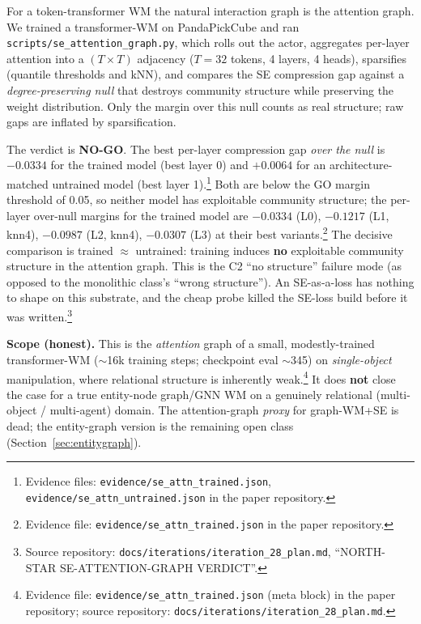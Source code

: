 \documentclass{article}
\begin{document}
For a token-transformer WM the natural interaction graph is the attention graph. We trained a transformer-WM on PandaPickCube and ran \texttt{scripts/se\_attention\_graph.py}, which rolls out the actor, aggregates per-layer attention into a $(T \times T)$ adjacency ($T=32$ tokens, 4 layers, 4 heads), sparsifies (quantile thresholds and kNN), and compares the SE compression gap against a \emph{degree-preserving null} that destroys community structure while preserving the weight distribution. Only the margin over this null counts as real structure; raw gaps are inflated by sparsification.

The verdict is \textbf{NO-GO}. The best per-layer compression gap \emph{over the null} is $\mathbf{-0.0334}$ for the trained model (best layer 0) and $\mathbf{+0.0064}$ for an architecture-matched untrained model (best layer 1).\footnote{Evidence files: \texttt{evidence/se\_attn\_trained.json}, \texttt{evidence/se\_attn\_untrained.json} in the paper repository.} Both are below the GO margin threshold of 0.05, so neither model has exploitable community structure; the per-layer over-null margins for the trained model are $-0.0334$ (L0), $-0.1217$ (L1, knn4), $-0.0987$ (L2, knn4), $-0.0307$ (L3) at their best variants.\footnote{Evidence file: \texttt{evidence/se\_attn\_trained.json} in the paper repository.} The decisive comparison is trained $\approx$ untrained: training induces \textbf{no} exploitable community structure in the attention graph. This is the C2 ``no structure'' failure mode (as opposed to the monolithic class's ``wrong structure''). An SE-as-a-loss has nothing to shape on this substrate, and the cheap probe killed the SE-loss build before it was written.\footnote{Source repository: \texttt{docs/iterations/iteration\_28\_plan.md}, ``NORTH-STAR SE-ATTENTION-GRAPH VERDICT''.}

\textbf{Scope (honest).} This is the \emph{attention} graph of a small, modestly-trained transformer-WM ($\sim$16k training steps; checkpoint eval $\sim$345) on \emph{single-object} manipulation, where relational structure is inherently weak.\footnote{Evidence file: \texttt{evidence/se\_attn\_trained.json} (meta block) in the paper repository; source repository: \texttt{docs/iterations/iteration\_28\_plan.md}.} It does \textbf{not} close the case for a true entity-node graph/GNN WM on a genuinely relational (multi-object / multi-agent) domain. The attention-graph \emph{proxy} for graph-WM+SE is dead; the entity-graph version is the remaining open class (Section~\ref{sec:entitygraph}).
\end{document}
